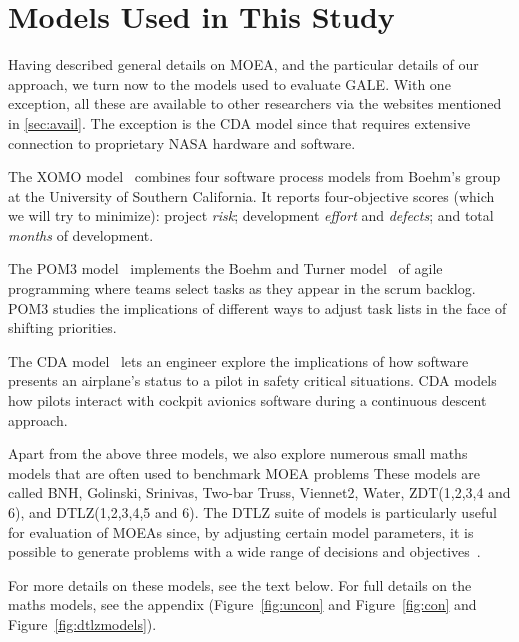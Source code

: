 \documentclass[10pt,journal,compsoc]{IEEEtran}
\newcommand{\tion}[1]{\textsection\ref{sec:#1}}
\newcommand{\fig}[1]{Figure~\ref{fig:#1}}
\newenvironment{changed}{\par}{\par}
\newcommand{\addit}[1]{\begin{changed}\end{changed}}
\begin{document}
\begin{changed}
\addit{cocont}

\section{Models Used in This Study}\label{sec:models}
Having described general details on MOEA, and the particular details of our approach, we turn now to the models used to evaluate GALE.
With one exception, all these  are available to other researchers via the websites mentioned in \tion{avail}. 
The exception is the CDA model since that requires extensive connection to proprietary NASA hardware and software.

The XOMO model~\cite{me07f,me09a,me09e} combines four software process models from Boehm’s group at the University of Southern California.
It reports four-objective scores (which we will try to minimize): project {\em risk}; development {\em effort} and {\em defects}; and total {\em months} of development.

The POM3 model~\cite{port08,me09j}  implements the Boehm and Turner model~\cite{port08,1204376,turner03} of agile programming where teams select tasks as they appear in the scrum backlog.
POM3 studies the implications of different ways to adjust task lists in the face of shifting priorities.



The CDA model~\cite{Kim2011,Pritchett2011,Feigh2012,Kim2013,Pritchett2013,krall15:hms} lets an engineer explore the implications of how software presents an airplane's status to a pilot in safety critical situations. 
CDA models how pilots interact with cockpit avionics software during a continuous descent approach.

Apart from the above three models, we also explore numerous small maths models that are often used to benchmark MOEA problems 
These models are called BNH, Golinski, Srinivas, Two-bar Truss, Viennet2, Water, ZDT(1,2,3,4 and 6), and DTLZ(1,2,3,4,5 and 6).
The  DTLZ suite of models is particularly useful for evaluation of MOEAs since, by adjusting certain model  parameters, it is possible to generate problems with a wide range of decisions and objectives~\cite{Zitzler2000zdtpaper,dtlz2001a}.

For more details on these models, see the text below.
For full details on the maths models, see the appendix (\fig{uncon} and \fig{con} and \fig{dtlzmodels}).





\addit{xomo}

\addit{xomocases}

\end{changed}
\end{document}
